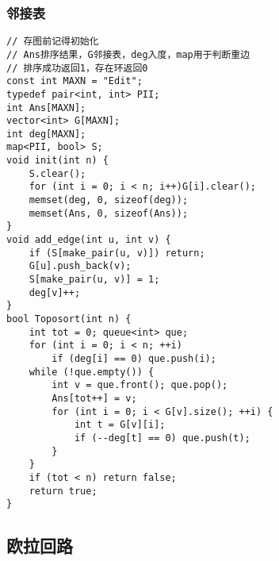 \documentclass[a4paper]{article}
\begin{document}
\subsubsection{邻接表}
\begin{lstlisting}
// 存图前记得初始化
// Ans排序结果，G邻接表，deg入度，map用于判断重边
// 排序成功返回1，存在环返回0
const int MAXN = "Edit";
typedef pair<int, int> PII;
int Ans[MAXN];
vector<int> G[MAXN];
int deg[MAXN];
map<PII, bool> S;
void init(int n) {
	S.clear();
	for (int i = 0; i < n; i++)G[i].clear();
	memset(deg, 0, sizeof(deg));
	memset(Ans, 0, sizeof(Ans));
}
void add_edge(int u, int v) {
	if (S[make_pair(u, v)]) return;
	G[u].push_back(v);
	S[make_pair(u, v)] = 1;
	deg[v]++;
}
bool Toposort(int n) {
	int tot = 0; queue<int> que;
	for (int i = 0; i < n; ++i)
		if (deg[i] == 0) que.push(i);
	while (!que.empty()) {
		int v = que.front(); que.pop();
		Ans[tot++] = v;
		for (int i = 0; i < G[v].size(); ++i) {
			int t = G[v][i];
			if (--deg[t] == 0) que.push(t);
		}
	}
	if (tot < n) return false;
	return true;
}
\end{lstlisting}
\subsection{欧拉回路}
\end{document}
